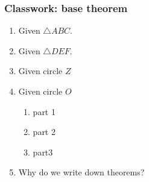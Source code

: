 \documentclass[12pt, oneside]{article}
\begin{document}
\subsubsection*{Classwork: base theorem}
\begin{enumerate}

  \item Given $\triangle ABC$.

  \item Given $\triangle DEF$.\\[0.5cm]

\newpage
    \item Given circle $Z$

    \item Given circle $O$
      \begin{enumerate}
        \item part 1
        \item part 2
        \item part3
      \end{enumerate}
    
    \item Why do we write down theorems?

\end{enumerate}
\end{document}
